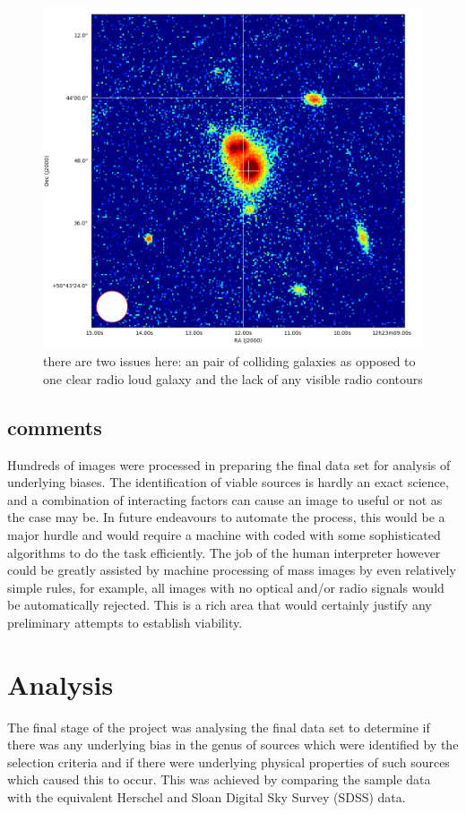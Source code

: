 \documentclass{article}
\begin{document}
\begin{figure}
    \centering
    \includegraphics[scale = 0.5]{bad4.png}
    \caption{there are two issues here: an pair of colliding galaxies as opposed to one clear radio loud galaxy and the lack of any visible radio contours}
\end{figure}

\subsection{comments}
Hundreds of images were processed in preparing the final data set for analysis of underlying biases. The identification of viable sources is hardly an exact science, and a combination of interacting factors can cause an image to useful or not as the case may be. In future endeavours to automate the process, this would be a major hurdle and would require a machine with coded with some sophisticated algorithms to do the task efficiently. The job of the human interpreter however could be greatly assisted by machine processing of mass images by even relatively simple rules, for example, all images with no optical and/or radio signals would be automatically rejected. This is a rich area that would certainly justify any preliminary attempts to establish viability.
\newpage

\section{Analysis}
The final stage of the project was analysing the final data set to determine if there was any underlying bias in the genus of sources which were identified by the selection criteria and if there were underlying physical properties of such sources which caused this to occur. This was achieved by comparing the sample data with the equivalent Herschel and Sloan Digital Sky Survey (SDSS) data.
\end{document}
